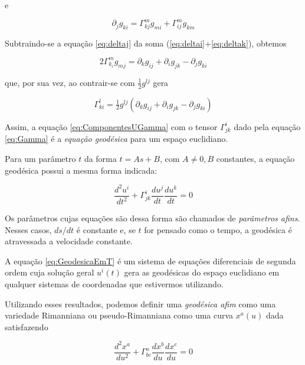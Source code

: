 e

\begin{equation}\label{eq:deltaj}
\partial_{j} g_{k i}=\Gamma_{k j}^{m} g_{m i}+\Gamma_{i j}^{m} g_{k m}
\end{equation}

Subtraindo-se a equação \ref{eq:deltaj} da soma (\ref{eq:deltai}+\ref{eq:deltak}), obtemos

\[2 \Gamma_{k_{i}}^{m} g_{m j}=\partial_{k} g_{i j}+\partial_{i} g_{j k}-\partial_{j} g_{k i}\]

que, por sua vez, ao contrair-se com $ \tfrac{1}{2} g^{l j} $ gera

\begin{equation}\label{eq:Gamma}
\boxed{\Gamma_{k i}^{l}=\tfrac{1}{2} g^{l j}\left(\partial_{k} g_{i j}+\partial_{i} g_{j k}-\partial_{j} g_{k i}\right)}
\end{equation}


Assim, a equação \ref{eq:ComponentesUGamma} com o tensor $ \Gamma_{jk}^i $ dado pela equação \ref{eq:Gamma} é a \textit{equação geodésica} para um espaço euclidiano.

Para um parâmetro $ t $ da forma $ t = As+B $, com $ A\neq0,B $ constantes, a equação geodésica possui a mesma forma indicada:

\begin{equation}\label{eq:GeodesicaEmT}
\frac{d^{2} u^{i}}{d t^{2}}+\Gamma_{j k}^{i} \frac{d u^{j}}{d t} \frac{d u^{k}}{d t}=0
\end{equation}

Os parâmetros cujas equações são dessa forma são chamados de \textit{parâmetros afins}. Nesses casos, $ ds/dt $ é constante e, se $ t $ for pensado como o tempo, a geodésica é atravessada a velocidade constante.

A equação \ref{eq:GeodesicaEmT} é um sistema de equações diferenciais de segunda ordem cuja solução geral $ u^i(t) $ gera as geodésicas do espaço euclidiano em qualquer sistemas de coordenadas que estivermos utilizando.

Utilizando esses resultados, podemos definir uma \textit{geodésica afim} como uma variedade Rimanniana ou pseudo-Rimanniana como uma curva $ x^a(u) $ dada satisfazendo

\begin{equation}\label{eq:GeodesicaAfimPseudoRimanniana}
\boxed{\frac{d^{2} x^{a}}{d u^{2}}+\Gamma_{b c}^{a} \frac{d x^{b}}{d u} \frac{d x^{c}}{d u}=0}
\end{equation}

